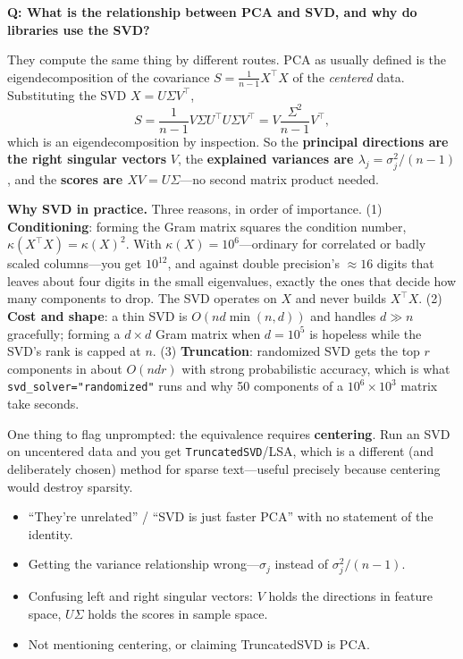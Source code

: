 \begin{interviewq}
\textbf{Q: What is the relationship between PCA and SVD, and why do libraries use the SVD?}

 \quad {} \quad \badgefreq{\freqmed}

\stronganswer

They compute the same thing by different routes. PCA as usually defined is the eigendecomposition of the covariance $S = \frac{1}{n-1}X^\top X$ of the \emph{centered} data. Substituting the SVD $X = U\Sigma V^\top$,
\begin{equation*}
S = \frac{1}{n-1}V\Sigma U^\top U \Sigma V^\top = V\frac{\Sigma^2}{n-1}V^\top ,
\end{equation*}
which is an eigendecomposition by inspection. So the \textbf{principal directions are the right singular vectors} $V$, the \textbf{explained variances are $\lambda_j = \sigma_j^2/(n-1)$}, and the \textbf{scores are $XV = U\Sigma$}---no second matrix product needed.

\textbf{Why SVD in practice.} Three reasons, in order of importance. (1) \textbf{Conditioning}: forming the Gram matrix squares the condition number, $\kappa(X^\top X) = \kappa(X)^2$. With $\kappa(X)=10^6$---ordinary for correlated or badly scaled columns---you get $10^{12}$, and against double precision's $\approx16$ digits that leaves about four digits in the small eigenvalues, exactly the ones that decide how many components to drop. The SVD operates on $X$ and never builds $X^\top X$. (2) \textbf{Cost and shape}: a thin SVD is $O(nd\min(n,d))$ and handles $d \gg n$ gracefully; forming a $d\times d$ Gram matrix when $d = 10^5$ is hopeless while the SVD's rank is capped at $n$. (3) \textbf{Truncation}: randomized SVD gets the top $r$ components in about $O(ndr)$ with strong probabilistic accuracy, which is what \texttt{svd\_solver="randomized"} runs and why 50 components of a $10^6\times10^3$ matrix take seconds.

One thing to flag unprompted: the equivalence requires \textbf{centering}. Run an SVD on uncentered data and you get \texttt{TruncatedSVD}/LSA, which is a different (and deliberately chosen) method for sparse text---useful precisely because centering would destroy sparsity.

\redflags
\begin{itemize}
    \item ``They're unrelated'' / ``SVD is just faster PCA'' with no statement of the identity.
    \item Getting the variance relationship wrong---$\sigma_j$ instead of $\sigma_j^2/(n-1)$.
    \item Confusing left and right singular vectors: $V$ holds the directions in feature space, $U\Sigma$ holds the scores in sample space.
    \item Not mentioning centering, or claiming TruncatedSVD is PCA.
\end{itemize}


\end{interviewq}
